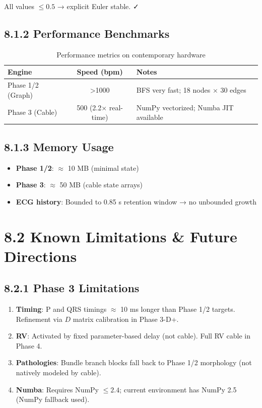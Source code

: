 \documentclass[12pt,oneside,a4paper]{book}
\begin{document}
All values \(\leq 0.5\) → explicit Euler stable. ✓

\subsection{8.1.2 Performance Benchmarks}

\begin{table}[H]
\centering
\begin{tabularx}{\textwidth}{|l|c|X|}
\hline
\textbf{Engine} & \textbf{Speed (bpm)} & \textbf{Notes} \\
\hline
Phase 1/2 (Graph) & \textgreater 1000 & BFS very fast; 18 nodes × 30 edges \\
Phase 3 (Cable) & 500 (2.2× real-time) & NumPy vectorized; Numba JIT available \\
\hline
\end{tabularx}
\caption{Performance metrics on contemporary hardware}
\label{tab:performance}
\end{table}

\subsection{8.1.3 Memory Usage}

\begin{itemize}
  \item \textbf{Phase 1/2}: \(\approx\) 10 MB (minimal state)
  \item \textbf{Phase 3}: \(\approx\) 50 MB (cable state arrays)
  \item \textbf{ECG history}: Bounded to 0.85 s retention window → no unbounded growth
\end{itemize}

\section{8.2 Known Limitations \& Future Directions}

\subsection{8.2.1 Phase 3 Limitations}

\begin{enumerate}
  \item \textbf{Timing}: P and QRS timings \(\approx\) 10 ms longer than Phase 1/2 targets. Refinement via $D$ matrix calibration in Phase 3-D+.
  \item \textbf{RV}: Activated by fixed parameter-based delay (not cable). Full RV cable in Phase 4.
  \item \textbf{Pathologies}: Bundle branch blocks fall back to Phase 1/2 morphology (not natively modeled by cable).
  \item \textbf{Numba}: Requires NumPy $\leq 2.4$; current environment has NumPy 2.5 (NumPy fallback used).
\end{enumerate}
\end{document}
